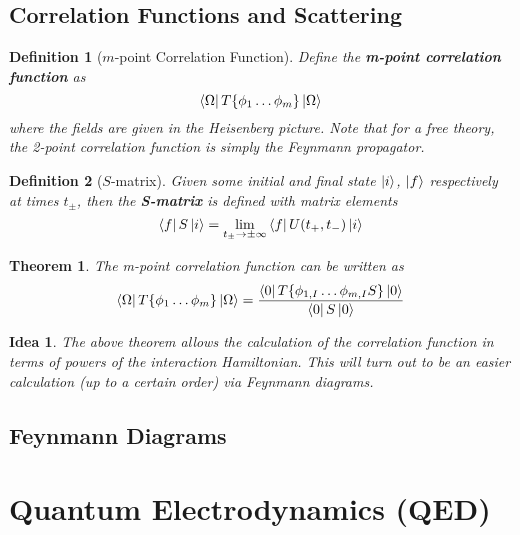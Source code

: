 \documentclass{article}
\newtheorem{theorem}{Theorem}[subsection]
\newtheorem{definition}{Definition}[subsection]
\newtheorem*{idea}{Idea}
\newcommand{\bam}[1]{\textbf{#1}}
\begin{document}
\subsection{Correlation Functions and Scattering}

\begin{definition}[$m$-point Correlation Function]
Define the \bam{m-point correlation function} as 
\[
\bra{\Omega} T\{ \phi_1 \dots \phi_m \} \ket{\Omega}
\]
where the fields are given in the Heisenberg picture. Note that for a free theory, the 2-point correlation function is simply the Feynmann propagator. 
\end{definition}

\begin{definition}[$S$-matrix]
Given some initial and final state $\ket{i}$, $\ket{f}$ respectively at times $t_\pm$, then the \bam{S-matrix} is defined with matrix elements 
\[
\bra{f}S\ket{i} = \lim_{t_\pm \to \pm\infty} \bra{f} U(t_+, t_-) \ket{i}
\]
\end{definition}

\begin{theorem}
The m-point correlation function can be written as 
\[
\bra{\Omega} T\{ \phi_1 \dots \phi_m \} \ket{\Omega} = \frac{\bra{0} T\{\phi_{1,I} \dots \phi_{m,I} S \} \ket{0}}{\bra{0} S \ket{0}}
\]
\end{theorem}

\begin{idea}
The above theorem allows the calculation of the correlation function in terms of powers of the interaction Hamiltonian. This will turn out to be an easier calculation (up to a certain order) via Feynmann diagrams. 
\end{idea}

\subsection{Feynmann Diagrams}

\section{Quantum Electrodynamics (QED)}
\end{document}
